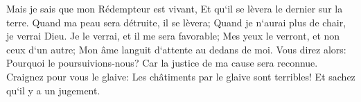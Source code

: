\verse Mais je sais que mon Rédempteur est vivant, Et qu`il se lèvera le dernier sur la terre. 
\verse Quand ma peau sera détruite, il se lèvera; Quand je n`aurai plus de chair, je verrai Dieu. 
\verse Je le verrai, et il me sera favorable; Mes yeux le verront, et non ceux d`un autre; Mon âme languit d`attente au dedans de moi. 
\verse Vous direz alors: Pourquoi le poursuivions-nous? Car la justice de ma cause sera reconnue. 
\verse Craignez pour vous le glaive: Les châtiments par le glaive sont terribles! Et sachez qu`il y a un jugement. 

\chapter{}

